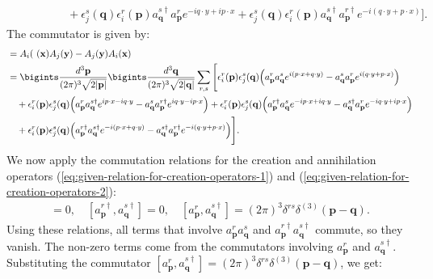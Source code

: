 \begin{enumerate}
\begin{align}
    &\hspace{50pt} + \epsilon_j^s(\mathbf{q}) \epsilon_i^r(\mathbf{p}) a^{s\dagger}_{\mathbf{q}} a^r_{\mathbf{p}} e^{-i q \cdot y + i p \cdot x} + \epsilon_j^s(\mathbf{q}) \epsilon_i^r(\mathbf{p}) a^{s\dagger}_{\mathbf{q}} a^{r\dagger}_{\mathbf{p}} e^{-i (q \cdot y + p \cdot x)} \Bigg].
\end{align}
The commutator is given by:
\begin{align}
    [A_i(\mathbf{x}), A_j(\mathbf{y})] &= A_i(\    (\mathbf{x}) A_j(\mathbf{y}) - A_j(\mathbf{y}) A_i(\mathbf{x}) \nonumber \\
    &= \bigints\frac{d^3 \mathbf{p}}{(2\pi)^3 \sqrt{2|\mathbf{p}|}} \bigints\frac{d^3 \mathbf{q}}{(2\pi)^3 \sqrt{2|\mathbf{q}|}} \sum_{r,s} \Bigg[ \epsilon_i^r(\mathbf{p}) \epsilon_j^s(\mathbf{q}) \Big( a^r_{\mathbf{p}} a^s_{\mathbf{q}} e^{i (p \cdot x + q \cdot y)} - a^s_{\mathbf{q}} a^r_{\mathbf{p}} e^{i (q \cdot y + p \cdot x)} \Big) \nonumber \\
    &\quad + \epsilon_i^r(\mathbf{p}) \epsilon_j^s(\mathbf{q}) \Big( a^r_{\mathbf{p}} a^{s\dagger}_{\mathbf{q}} e^{i p \cdot x - i q \cdot y} - a^s_{\mathbf{q}} a^{r\dagger}_{\mathbf{p}} e^{i q \cdot y - i p \cdot x} \Big) + \epsilon_i^r(\mathbf{p}) \epsilon_j^s(\mathbf{q}) \Big( a^{r\dagger}_{\mathbf{p}} a^s_{\mathbf{q}} e^{-i p \cdot x + i q \cdot y} - a^{s\dagger}_{\mathbf{q}} a^r_{\mathbf{p}} e^{-i q \cdot y + i p \cdot x} \Big) \nonumber \\
    &\quad + \epsilon_i^r(\mathbf{p}) \epsilon_j^s(\mathbf{q}) \Big( a^{r\dagger}_{\mathbf{p}} a^{s\dagger}_{\mathbf{q}} e^{-i (p \cdot x + q \cdot y)} - a^{s\dagger}_{\mathbf{q}} a^{r\dagger}_{\mathbf{p}} e^{-i (q \cdot y + p \cdot x)} \Big) \Bigg]. 
\end{align}
We now apply the commutation relations for the creation and annihilation operators (\ref{eq:given-relation-for-creation-operators-1}) and (\ref{eq:given-relation-for-creation-operators-2}):
\begin{align*}
    [a^r_{\mathbf{p}}, a^s_{\mathbf{q}}] = 0, \quad [a^{r\dagger}_{\mathbf{p}}, a^{s\dagger}_{\mathbf{q}}] = 0, \quad [a^r_{\mathbf{p}}, a^{s\dagger}_{\mathbf{q}}] = (2\pi)^3 \delta^{rs} \delta^{(3)}(\mathbf{p} - \mathbf{q}). 
\end{align*}
Using these relations, all terms that involve $a^r_{\mathbf{p}} a^s_{\mathbf{q}}$ and $a^{r\dagger}_{\mathbf{p}} a^{s\dagger}_{\mathbf{q}}$ commute, so they vanish. The non-zero terms come from the commutators involving $a^r_{\mathbf{p}}$ and $a^{s\dagger}_{\mathbf{q}}$. Substituting the commutator $[a^r_{\mathbf{p}}, a^{s\dagger}_{\mathbf{q}}] = (2\pi)^3 \delta^{rs} \delta^{(3)}(\mathbf{p} - \mathbf{q})$, we get:

\end{enumerate}
